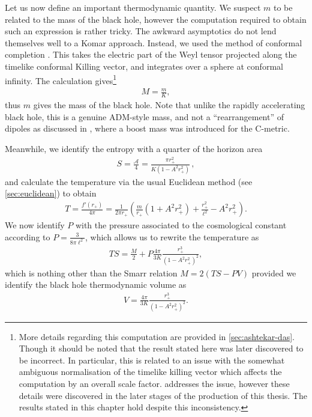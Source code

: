 \documentclass[
twoside,
openright,
frontopenright,
]{dmathesis}
\begin{document}
Let us now define an important thermodynamic quantity. We suspect $m$ to be
related to the mass of the black hole, however the computation required to
obtain such an expression is rather tricky. The awkward asymptotics do not lend
themselves well to a Komar approach. Instead, we used the method of conformal
completion \cite{Ashtekar:1984zz, Ashtekar:1999jx, Das:2000cu}. This takes the
electric part of the Weyl tensor projected along the timelike conformal Killing
vector, and integrates over a sphere at conformal infinity. The calculation
gives\footnote{More details regarding this computation are provided in
  \cref{sec:ashtekar-das}. Though it should be noted that the result stated here
  was later discovered to be incorrect. In particular, this is related to an
  issue with the somewhat ambiguous normalisation of the timelike killing vector
  which affects the computation by an overall scale factor. 
  addresses the issue, however these details were discovered in the later stages
  of the production of this thesis. The results stated in this chapter hold
  despite this inconsistency.}
\begin{align}
  M = \frac{m}{K},
  \label{eq:massAcc}
\end{align}
thus $m$ gives the mass of the black hole. Note that unlike the rapidly
accelerating black hole, this is a genuine ADM-style mass, and not a
``rearrangement'' of dipoles as discussed in \cite{Dutta:2005iy}, where a boost
mass was introduced for the C-metric.

Meanwhile, we identify the entropy with a quarter of the horizon 
area 
\begin{align}
  \label{eq:entropyFT}
S=\frac{\mathcal{A}}{4}=\frac{\pi r_+^2}{K(1-A^2r_+^2)}\,,
\end{align}
and calculate the temperature via the usual Euclidean method (see
\cref{sec:euclidean}) to obtain
\begin{align}
T=\frac{f'(r_+)}{4\pi} = \frac{1}{2\pi r_+}\left(\frac{m}{r_+}\left(1+A^2r_+^2
\right) + \frac{r_+^2}{\ell^2} - A^2 r_+^2\right).
\end{align}
We now identify $P$ with the pressure associated to the cosmological constant
according to $P=\frac{3}{8\pi \ell^2}$, which allows us to rewrite the
temperature as
\begin{align}
TS = \frac{M}{2}+ P \frac{4\pi}{3K}
\frac{r_+^3}{(1-A^2r_+^2)^2},
\end{align}
which is nothing other than the Smarr relation $M= 2(TS - PV)$ provided we
identify the black hole thermodynamic volume as
\begin{align}
V=\frac{4\pi}{3K}\frac{r_+^3}{(1-A^2r_+^2)^2}.
\end{align}
\end{document}
